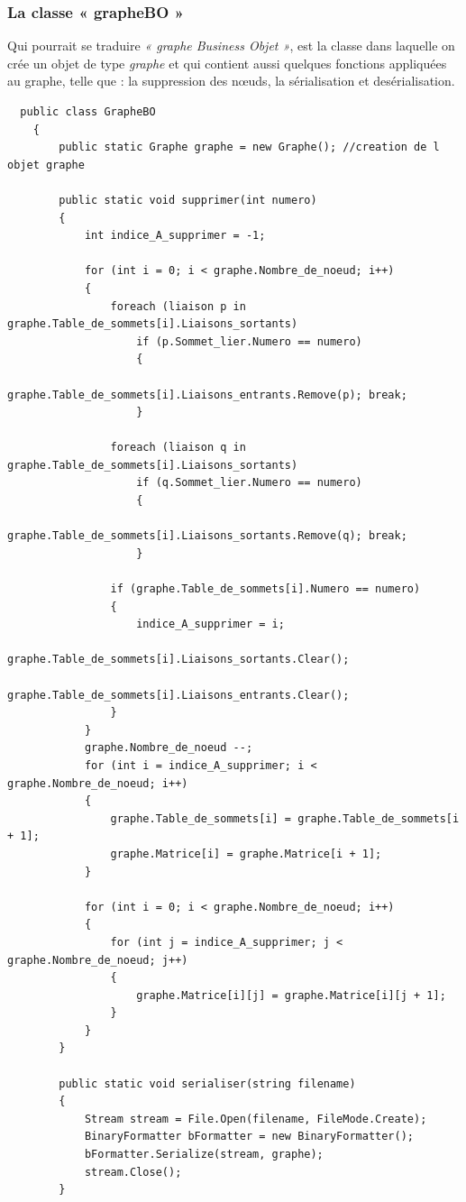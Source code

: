 \documentclass[11pt,twoside,a4paper]{article}
\begin{document}
\subsubsection{La classe « grapheBO »}
 Qui pourrait se traduire {\it « graphe Business Objet »}, est la classe dans laquelle on crée un objet de type {\it graphe} et qui contient aussi quelques fonctions appliquées au graphe, telle que : la suppression des nœuds,  la sérialisation et desérialisation.
\begin{verbatim}
  public class GrapheBO
    {
        public static Graphe graphe = new Graphe();	//creation de l objet graphe

        public static void supprimer(int numero)
        {
            int indice_A_supprimer = -1;

            for (int i = 0; i < graphe.Nombre_de_noeud; i++)
            {
                foreach (liaison p in graphe.Table_de_sommets[i].Liaisons_sortants)
                    if (p.Sommet_lier.Numero == numero)
                    {
                        graphe.Table_de_sommets[i].Liaisons_entrants.Remove(p); break;
                    }

                foreach (liaison q in graphe.Table_de_sommets[i].Liaisons_sortants)
                    if (q.Sommet_lier.Numero == numero)
                    {
                        graphe.Table_de_sommets[i].Liaisons_sortants.Remove(q); break;
                    }

                if (graphe.Table_de_sommets[i].Numero == numero)
                {
                    indice_A_supprimer = i;
                    graphe.Table_de_sommets[i].Liaisons_sortants.Clear();
                    graphe.Table_de_sommets[i].Liaisons_entrants.Clear();
                }
            }
            graphe.Nombre_de_noeud --;
            for (int i = indice_A_supprimer; i < graphe.Nombre_de_noeud; i++)
            {
                graphe.Table_de_sommets[i] = graphe.Table_de_sommets[i + 1];
                graphe.Matrice[i] = graphe.Matrice[i + 1];
            }

            for (int i = 0; i < graphe.Nombre_de_noeud; i++)
            {
                for (int j = indice_A_supprimer; j < graphe.Nombre_de_noeud; j++)
                {
                    graphe.Matrice[i][j] = graphe.Matrice[i][j + 1];
                }
            }
        }

        public static void serialiser(string filename)
        {
            Stream stream = File.Open(filename, FileMode.Create);
            BinaryFormatter bFormatter = new BinaryFormatter();
            bFormatter.Serialize(stream, graphe);
            stream.Close();
        }


\end{verbatim}
\end{document}
